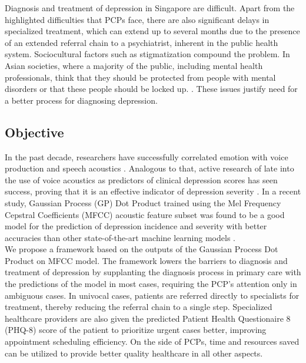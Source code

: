 \documentclass{article}
\begin{document}
	Diagnosis and treatment of depression in Singapore are difficult. Apart from the highlighted difficulties that PCPs face, there are also significant delays in specialized treatment, which can extend up to several months due to the presence of an extended referral chain to a psychiatrist, inherent in the public health system. Sociocultural factors such as stigmatization compound the problem. In Asian societies, where a majority of the public, including mental health professionals, think that they should be protected from people with mental disorders or that these people should be locked up. \cite{chong2009}. These issues justify need for a better process for diagnosing depression. \\
	
	\subsection{Objective}
	In the past decade, researchers have successfully correlated emotion with voice production and speech acoustics \cite{uwa2001}. 
    Analogous to that, active research of late into the use of voice acoustics as predictors of clinical depression scores has seen success, proving that it is an effective indicator of depression severity \cite{jov2016}. In a recent study, Gaussian Process (GP) Dot Product trained using the Mel Frequency Cepstral Coefficients (MFCC) acoustic feature subset was found to be a good model for the prediction of depression incidence and severity with better accuracies than other state-of-the-art machine learning models \cite{cs42462016}.\\

	We propose a framework based on the outputs of the Gaussian Process Dot Product on MFCC model. The framework lowers the barriers to diagnosis and treatment of depression by supplanting the diagnosis process in primary care with the predictions of the model in most cases, requiring the PCP's attention only in ambiguous cases. In univocal cases, patients are referred directly to specialists for treatment, thereby reducing the referral chain to a single step. Specialized healthcare providers are also given the predicted Patient Health Questionaire 8 (PHQ-8) score of the patient to prioritize urgent cases better, improving appointment scheduling efficiency. On the side of PCPs, time and resources saved can be utilized to provide better quality healthcare in all other aspects.
	
\end{document}
